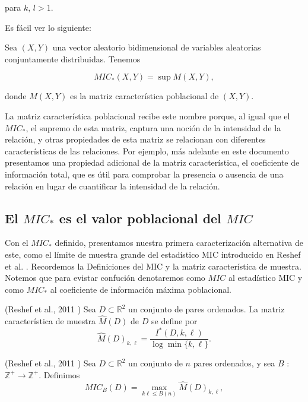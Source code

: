 	para $k$, $l > 1$.
	
	Es f\'acil ver lo siguiente:

	\begin{prop}
		Sea $(X,Y)$ una vector aleatorio bidimensional de variables aleatorias conjuntamente distribuidas. Tenemos
	
	$$MIC_*(X,Y) = \sup M(X,Y),$$
	
	donde $M(X,Y)$ es la matriz caracter\'istica poblacional de $(X,Y)$.
	\end{prop}	

	
	La matriz caracter\'istica poblacional recibe este nombre porque, al igual que el $MIC_*$, el supremo de esta matriz, captura una noci\'on de la intensidad de la relaci\'on, y otras propiedades de esta matriz se relacionan con diferentes caracter\'isticas de las relaciones. Por ejemplo, m\'as adelante en este documento presentamos una propiedad adicional de la matriz caracter\'istica, el coeficiente de informaci\'on total, que es \'util para comprobar la presencia o ausencia de una relaci\'on en lugar de cuantificar la intensidad de la relaci\'on.

	\subsection[]{El $MIC_*$ es el valor poblacional del $MIC$}

	Con el $MIC_*$ definido, presentamos nuestra primera caracterizaci\'on alternativa de este, como el l\'imite de muestra grande del estad\'istico MIC introducido en Reshef et al. \cite{Reshef2011}. Recordemos la Definiciones del MIC y la matriz caracter\'istica de muestra. Notemos que para evistar confuci\'on denotaremos como $MIC$ al estad\'istico MIC y como $MIC_*$ al coeficiente de informaci\'on m\'axima poblacional.

	\begin{defn}
		(Reshef et al., 2011 \cite{Reshef2011})  Sea $D \subset \mathbb{R}^2$ un conjunto de pares ordenados. La matriz caracter\'istica de muestra $\widehat{M}(D)$ de $D$ se define por
		$$
		\widehat{M}(D)_{k, \ell}=\frac{I^*(D, k, \ell)}{\log \min \{k, \ell\}}.
		$$
	\end{defn}

	\begin{defn}
		(Reshef et al., 2011 \cite{Reshef2011}) Sea $D \subset \mathbb{R}^2$ un conjunto de $n$ pares ordenados, y sea $B$ : $\mathbb{Z}^{+} \rightarrow \mathbb{Z}^{+}$. Definimos
		$$
		M I C_B(D)=\max _{k \ell \leq B(n)} \widehat{M}(D)_{k, \ell},
		$$
	\end{defn}

